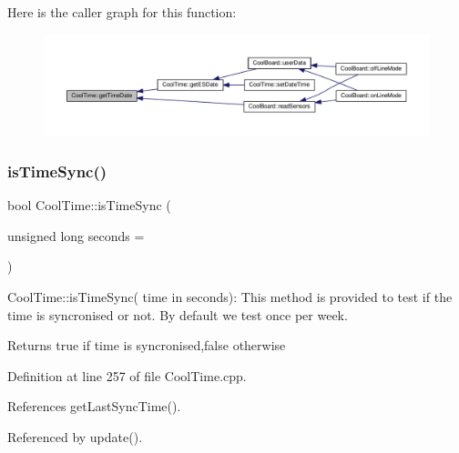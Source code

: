 Here is the caller graph for this function\+:\nopagebreak
\begin{figure}[H]
\begin{center}
\leavevmode
\includegraphics[width=350pt]{classCoolTime_a7a7501c5ca77dd1248bea704c44f986c_icgraph}
\end{center}
\end{figure}
\mbox{\label{classCoolTime_a5ae038a4498602b189f76a10bf02adf8}} 
\subsubsection{\texorpdfstring{is\+Time\+Sync()}{isTimeSync()}}
{\footnotesize\ttfamily bool Cool\+Time\+::is\+Time\+Sync (\begin{DoxyParamCaption}\item[{unsigned long}]{seconds = {} }\end{DoxyParamCaption})}

Cool\+Time\+::is\+Time\+Sync( time in seconds)\+: This method is provided to test if the time is syncronised or not. By default we test once per week.

\begin{DoxyReturn}{Returns}
true if time is syncronised,false otherwise 
\end{DoxyReturn}


Definition at line 257 of file Cool\+Time.\+cpp.



References get\+Last\+Sync\+Time().



Referenced by update().


